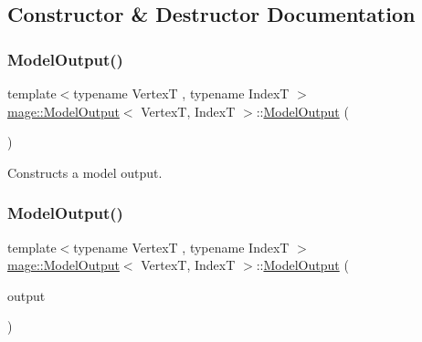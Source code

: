 \subsection{Constructor \& Destructor Documentation}
\hypertarget{structmage_1_1_model_output_a87c3036fd1e97045c6075ed729a5e8f2}{}\label{structmage_1_1_model_output_a87c3036fd1e97045c6075ed729a5e8f2} 
\subsubsection{\texorpdfstring{Model\+Output()}{ModelOutput()}\hspace{0.1cm}{\footnotesize\ttfamily [1/3]}}
{\footnotesize\ttfamily template$<$typename VertexT , typename IndexT $>$ \\
\hyperlink{structmage_1_1_model_output}{mage\+::\+Model\+Output}$<$ VertexT, IndexT $>$\+::\hyperlink{structmage_1_1_model_output}{Model\+Output} (\begin{DoxyParamCaption}{ }\end{DoxyParamCaption})\hspace{0.3cm}{\ttfamily [default]}}

Constructs a model output. \hypertarget{structmage_1_1_model_output_a8aed21d15e5c30a8ec200edf01e5f8fb}{}\label{structmage_1_1_model_output_a8aed21d15e5c30a8ec200edf01e5f8fb} 
\subsubsection{\texorpdfstring{Model\+Output()}{ModelOutput()}\hspace{0.1cm}{\footnotesize\ttfamily [2/3]}}
{\footnotesize\ttfamily template$<$typename VertexT , typename IndexT $>$ \\
\hyperlink{structmage_1_1_model_output}{mage\+::\+Model\+Output}$<$ VertexT, IndexT $>$\+::\hyperlink{structmage_1_1_model_output}{Model\+Output} (\begin{DoxyParamCaption}\item[{const \hyperlink{structmage_1_1_model_output}{Model\+Output}$<$ VertexT, IndexT $>$ \&}]{output }\end{DoxyParamCaption})\hspace{0.3cm}{\ttfamily [delete]}}

